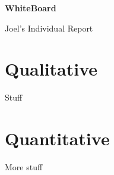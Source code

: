 \documentclass{article}
\begin{document}
\begin{center}

    \huge{\textbf{WhiteBoard}}

    \huge{Joel's Individual Report}

\end{center}

\vspace{10 pt}

\section{Qualitative}

Stuff

\section{Quantitative}

More stuff
\end{document}
